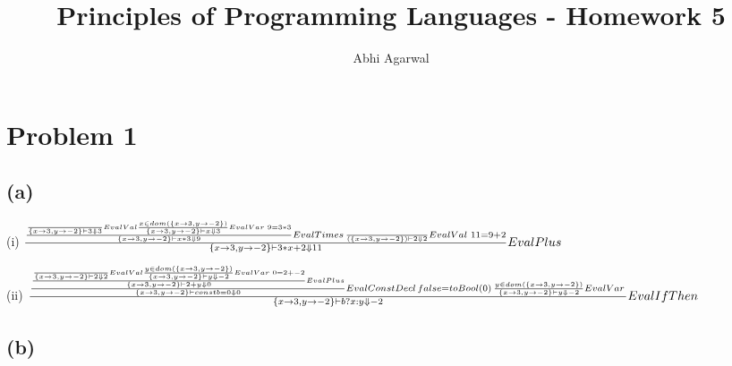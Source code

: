 \documentclass[11pt, oneside]{article}
\title{Principles of Programming Languages - Homework 5}
\author{Abhi Agarwal}
\date{}
\let\emptyset\varnothing
\newcommand{\forceindent}{\leavevmode{\parindent=1.5em\indent}}
\begin{document}
\maketitle
\section{Problem 1}
\subsection*{(a)}
\forceindent \par (i) 
$
\frac{
	\frac{
		\frac{
		}
		{
			\{x \rightarrow 3, y \rightarrow -2\} \vdash 3 \Downarrow 3
		} EvalVal
		\frac{
			x \in dom(\{x \rightarrow 3, y \rightarrow -2\})
		}
		{
			\{x \rightarrow 3, y \rightarrow -2\} \vdash x \Downarrow 3
		} EvalVar \thinspace \thinspace
		9 = 3 * 3
	}
	{
		\{x \rightarrow 3, y \rightarrow -2\} \vdash x * 3 \Downarrow 9
	} EvalTimes \thinspace
	\frac{
	}{
		(\{x \rightarrow 3, y \rightarrow -2\}) \vdash 2 \Downarrow 2
	} EvalVal \thinspace \thinspace
	11 = 9 + 2
	{
	}
}{
	\{x \rightarrow 3, y \rightarrow -2\} \vdash 3 * x + 2 \Downarrow 11
} EvalPlus
$

\par (ii)
$
\frac{
	\frac{
		\frac {
			\frac {
			}
			{
				\{x \rightarrow 3, y \rightarrow -2\} \vdash 2 \Downarrow 2
			} EvalVal
			\frac {
				y \in dom(\{x \rightarrow 3, y \rightarrow -2\})
			}
			{
				\{x \rightarrow 3, y \rightarrow -2\} \vdash y \Downarrow -2
			} EvalVar \thinspace \thinspace
			0 = 2 + -2
		}
		{
			\{x \rightarrow 3, y \rightarrow -2\} \vdash 2 + y \Downarrow 0
		} EvalPlus
	}
	{
		\{x \rightarrow 3, y \rightarrow -2\} \vdash const b = 0 \Downarrow 0
	} EvalConstDecl \thinspace
	false = toBool(0) \thinspace
	\frac{
		y \in dom(\{x \rightarrow 3, y \rightarrow -2\})
	}
	{
		\{x \rightarrow 3, y \rightarrow -2\} \vdash y \Downarrow -2
	} EvalVar \thinspace
}{
	\{x \rightarrow 3, y \rightarrow -2\} \vdash b ? x : y \Downarrow -2
} EvalIfThen
$

\subsection*{(b)}

\end{document}
